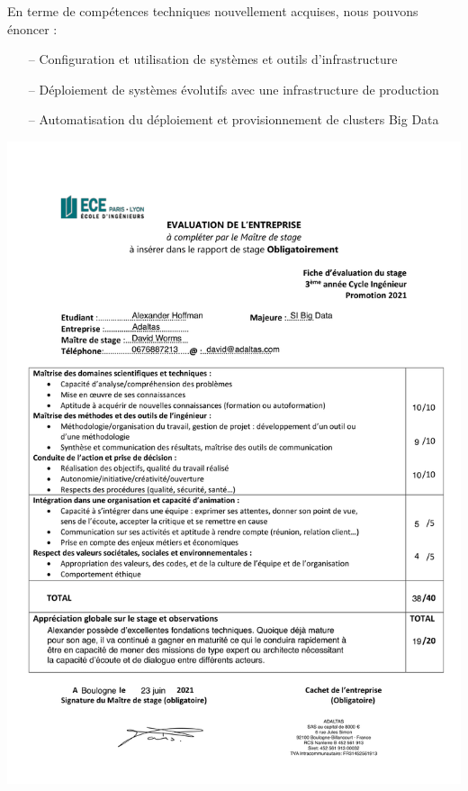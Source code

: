 \documentclass[12pt, french]{report}
\begin{document}
En terme de compétences techniques nouvellement acquises, nous pouvons énoncer :

\begin{itemize}
\item [--] Configuration et utilisation de systèmes et outils d'infrastructure
\item [--] Déploiement de systèmes évolutifs avec une infrastructure de production
\item [--] Automatisation du déploiement et provisionnement de clusters Big Data
\end{itemize}

\clearpage

\printglossaries



\includegraphics[scale=0.25]{assets/img/evaluation.png}


\end{document}
